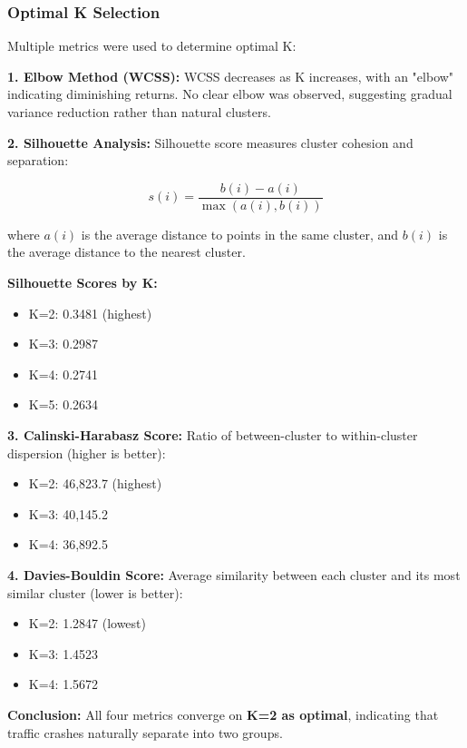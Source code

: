 \documentclass[12pt,man]{apa7}
\begin{document}
\subsubsection{Optimal K Selection}

Multiple metrics were used to determine optimal K:

\textbf{1. Elbow Method (WCSS):}
WCSS decreases as K increases, with an "elbow" indicating diminishing returns. No clear elbow was observed, suggesting gradual variance reduction rather than natural clusters.

\textbf{2. Silhouette Analysis:}
Silhouette score measures cluster cohesion and separation:

\begin{equation}
s(i) = \frac{b(i) - a(i)}{\max(a(i), b(i))}
\end{equation}

where $a(i)$ is the average distance to points in the same cluster, and $b(i)$ is the average distance to the nearest cluster.

\textbf{Silhouette Scores by K:}
\begin{itemize}
    \item K=2: 0.3481 (highest)
    \item K=3: 0.2987
    \item K=4: 0.2741
    \item K=5: 0.2634
\end{itemize}

\textbf{3. Calinski-Harabasz Score:}
Ratio of between-cluster to within-cluster dispersion (higher is better):
\begin{itemize}
    \item K=2: 46,823.7 (highest)
    \item K=3: 40,145.2
    \item K=4: 36,892.5
\end{itemize}

\textbf{4. Davies-Bouldin Score:}
Average similarity between each cluster and its most similar cluster (lower is better):
\begin{itemize}
    \item K=2: 1.2847 (lowest)
    \item K=3: 1.4523
    \item K=4: 1.5672
\end{itemize}

\textbf{Conclusion:} All four metrics converge on \textbf{K=2 as optimal}, indicating that traffic crashes naturally separate into two groups.
\end{document}
